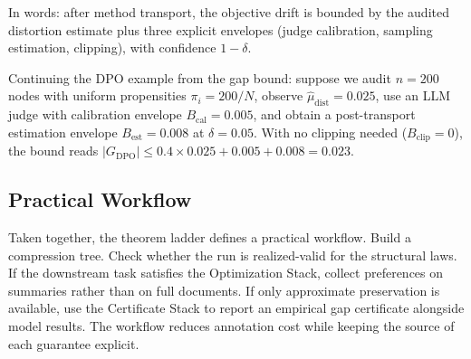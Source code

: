 \noindent In words: after method transport, the objective drift is bounded by the audited distortion estimate plus three explicit envelopes (judge calibration, sampling estimation, clipping), with confidence $1-\delta$.

Continuing the DPO example from the gap bound: suppose we audit $n = 200$ nodes with uniform propensities $\pi_i = 200/N$, observe $\hat{\mu}_{\mathrm{dist}} = 0.025$, use an LLM judge with calibration envelope $B_{\mathrm{cal}} = 0.005$, and obtain a post-transport estimation envelope $B_{\mathrm{est}} = 0.008$ at $\delta = 0.05$. With no clipping needed ($B_{\mathrm{clip}} = 0$), the bound reads $|G_{\mathrm{DPO}}| \le 0.4 \times 0.025 + 0.005 + 0.008 = 0.023$.

\subsection{Practical Workflow}

Taken together, the theorem ladder defines a practical workflow. Build a compression tree. Check whether the run is realized-valid for the structural laws. If the downstream task satisfies the Optimization Stack, collect preferences on summaries rather than on full documents. If only approximate preservation is available, use the Certificate Stack to report an empirical gap certificate alongside model results. The workflow reduces annotation cost while keeping the source of each guarantee explicit.
